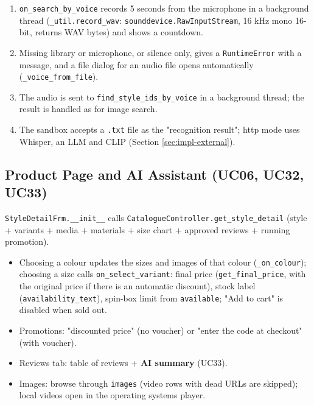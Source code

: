 \begin{enumerate}
\def\labelenumi{\arabic{enumi}.}
\tightlist
\item
  \texttt{on\_\allowbreak{}search\_\allowbreak{}by\_\allowbreak{}voice} records 5 seconds from the microphone
  in a background thread (\texttt{\_\allowbreak{}util.\allowbreak{}record\_\allowbreak{}wav}:
  \texttt{sounddevice.\allowbreak{}RawInputStream}, 16 kHz mono 16-bit, returns WAV
  bytes) and shows a countdown.
\item
  Missing library or microphone, or silence only, gives a
  \texttt{RuntimeError} with a message, and a file dialog for an audio
  file opens automatically (\texttt{\_\allowbreak{}voice\_\allowbreak{}from\_\allowbreak{}file}).
\item
  The audio is sent to \texttt{find\_\allowbreak{}style\_\allowbreak{}ids\_\allowbreak{}by\_\allowbreak{}voice} in a
  background thread; the result is handled as for image search.
\item
  The sandbox accepts a \texttt{.\allowbreak{}txt} file as the "recognition result";
  http mode uses Whisper, an LLM and CLIP (Section
  \ref{sec:impl-external}).
\end{enumerate}

\hypertarget{product-page-and-ai-assistant-uc06-uc32-uc33}{%
\subsection{Product Page and AI Assistant (UC06, UC32,
UC33)}\label{product-page-and-ai-assistant-uc06-uc32-uc33}}

\texttt{StyleDetailFrm.\allowbreak{}\_\allowbreak{}\_\allowbreak{}init\_\allowbreak{}\_\allowbreak{}} calls
\texttt{CatalogueController.\allowbreak{}get\_\allowbreak{}style\_\allowbreak{}detail} (style + variants +
media + materials + size chart + approved reviews + running promotion).

\begin{itemize}
\tightlist
\item
  Choosing a colour updates the sizes and images of that colour
  (\texttt{\_\allowbreak{}on\_\allowbreak{}colour}); choosing a size calls
  \texttt{on\_\allowbreak{}select\_\allowbreak{}variant}: final price (\texttt{get\_\allowbreak{}final\_\allowbreak{}price},
  with the original price if there is an automatic discount), stock
  label (\texttt{availability\_\allowbreak{}text}), spin-box limit from
  \texttt{available}; "Add to cart" is disabled when sold out.
\item
  Promotions: "discounted price" (no voucher) or "enter the code at
  checkout" (with voucher).
\item
  Reviews tab: table of reviews + \textbf{AI summary} (UC33).
\item
  Images: browse through \texttt{images} (video rows with dead URLs are
  skipped); local videos open in the operating system\textquotesingle s
  player.
\end{itemize}

